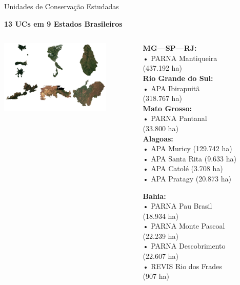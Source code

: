 \documentclass[aspectratio=169,11pt]{beamer}
\begin{document}
\begin{frame}{Unidades de Conservação Estudadas}
\vspace{-0.3cm}
\begin{center}
    \textbf{\large 13 UCs em 9 Estados Brasileiros}
\end{center}

\begin{columns}[c]
    \begin{column}{0.35\textwidth}
        \includegraphics[width=\textwidth,height=3.5cm,keepaspectratio]{img/mosaic_top1_output-each-area.jpg}
    \end{column}
    \begin{column}{0.63\textwidth}
        \begin{multicols}{2}
        {\scriptsize
        \textbf{MG---SP---RJ:}\\
        • PARNA Mantiqueira\\
        \quad (437.192 ha)\\[3pt]
        
        \textbf{Rio Grande do Sul:}\\
        • APA Ibirapuitã\\
        \quad (318.767 ha)\\[3pt]
        
        \textbf{Mato Grosso:}\\
        • PARNA Pantanal\\
        \quad (33.800 ha)\\[3pt]
        
        \textbf{Alagoas:}\\
        • APA Muricy (129.742 ha)\\
        • APA Santa Rita (9.633 ha)\\
        • APA Catolé (3.708 ha)\\
        • APA Pratagy (20.873 ha)\\[3pt]
        
        \columnbreak%
        
        \textbf{Bahia:}\\
        • PARNA Pau Brasil\\
        \quad (18.934 ha)\\
        • PARNA Monte Pascoal\\
        \quad (22.239 ha)\\
        • PARNA Descobrimento\\
        \quad (22.607 ha)\\
        • REVIS Rio dos Frades\\
        \quad (907 ha)\\[3pt]
        
}
\end{multicols}
\end{column}
\end{columns}
\end{frame}
\end{document}
